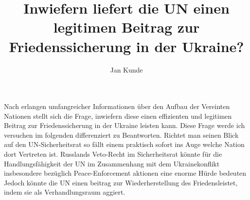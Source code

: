 \documentclass{article}
\author{Jan Kunde}
\date{}
\title{Inwiefern liefert die UN einen legitimen Beitrag zur Friedenssicherung in der Ukraine?}
\begin{document}
\maketitle
Nach erlangen umfangreicher Informationen über den Aufbau der Vereinten Nationen stellt sich die Frage, inwiefern diese einen effizienten und legitimen Beitrag zur Friedenssicherung
in der Ukraine leisten kann. Diese Frage werde ich versuchen im folgenden differenziert zu Beantworten.
\break
\break
Richtet man seinen Blick auf den UN-Sicherheitsrat so fällt einem praktisch sofort ins Auge welche Nation dort Vertreten ist. Russlands Veto-Recht im Sicherheitsrat könnte für die
Handlungsfähigkeit der UN im Zusammenhang mit dem Ukrainekonflikt insbesondere bezüglich Peace-Enforcement aktionen eine enorme Hürde bedeuten
Jedoch könnte die UN einen beitrag zur Wiederherstellung des Friedensleistet, indem sie als Verhandlungsraum aggiert.
\end{document}
